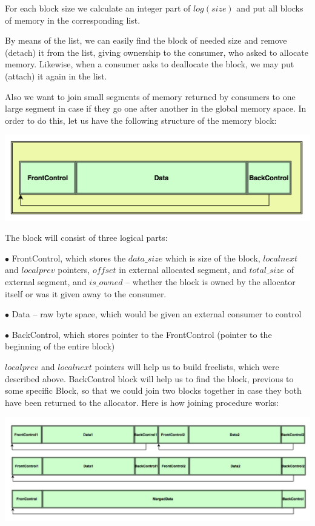 \documentclass{article}
\begin{document}
For each block size we calculate an integer part of $log(size)$ and put all blocks of memory in the corresponding list.

By means of the list, we can easily find the block of needed size and remove (detach) it from the list, giving ownership to the consumer, who asked to allocate memory. Likewise, when a consumer asks to deallocate the block, we may put (attach) it again in the list.

Also we want to join small segments of memory returned by consumers to one large segment in case if they go one after another in the global memory space. In order to do this, let us have the following structure of the memory block:

\begin{center}\includegraphics[width=0.5 \textwidth]{image2.png}\end{center}

The block will consist of three logical parts:

$\bullet$ FrontControl, which stores the $data\_size$ which is size of the block, $localnext$ and $localprev$ pointers, $offset$ in external allocated segment, and $total\_size$ of external segment, and $is\_owned$ -- whether the block is owned by the allocator itself or was it given away to the consumer.

$\bullet$ Data -- raw byte space, which would be given an external consumer to control

$\bullet$ BackControl, which stores pointer to the FrontControl (pointer to the beginning of the entire block)

$localprev$ and $localnext$ pointers will help us to build freelists, which were described above. BackControl block will help us to find the block, previous to some specific Block, so that we could join two blocks together in case they both have been returned to the allocator. Here is how joining procedure works:

\begin{center}\includegraphics[width=1 \textwidth]{image3.png}\end{center}
\end{document}

